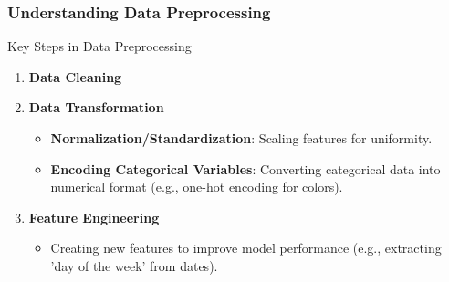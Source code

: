 \documentclass[aspectratio=169]{beamer}
\begin{document}
\begin{frame}[fragile]
    \frametitle{Understanding Data Preprocessing}
    \begin{block}{Key Steps in Data Preprocessing}
        \begin{enumerate}
            \item \textbf{Data Cleaning}
            \item \textbf{Data Transformation}
                \begin{itemize}
                    \item \textbf{Normalization/Standardization}: Scaling features for uniformity.
                    \item \textbf{Encoding Categorical Variables}: Converting categorical data into numerical format (e.g., one-hot encoding for colors).
                \end{itemize}
            \item \textbf{Feature Engineering}
                \begin{itemize}
                    \item Creating new features to improve model performance (e.g., extracting 'day of the week' from dates).
                \end{itemize}
        \end{enumerate}
    \end{block}
\end{frame}
\end{document}

